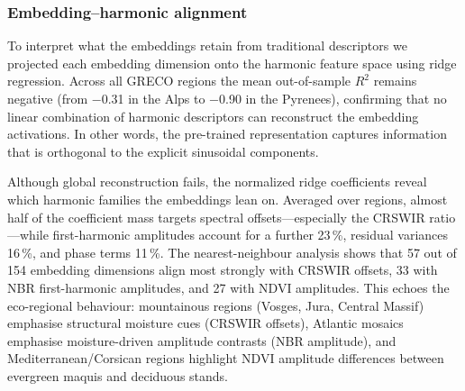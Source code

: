 \documentclass[utf8]{FrontiersinHarvard}
\begin{document}
\subsubsection{Embedding–harmonic alignment}

To interpret what the embeddings retain from traditional descriptors we projected each embedding dimension onto the harmonic feature space using ridge regression. Across all GRECO regions the mean out-of-sample \(R^2\) remains negative (from −0.31 in the Alps to −0.90 in the Pyrenees), confirming that no linear combination of harmonic descriptors can reconstruct the embedding activations. In other words, the pre-trained representation captures information that is orthogonal to the explicit sinusoidal components.

Although global reconstruction fails, the normalized ridge coefficients reveal which harmonic families the embeddings lean on. Averaged over regions, almost half of the coefficient mass targets spectral offsets—especially the CRSWIR ratio—while first-harmonic amplitudes account for a further 23\,\%, residual variances 16\,\%, and phase terms 11\,\%. The nearest-neighbour analysis shows that 57 out of 154 embedding dimensions align most strongly with CRSWIR offsets, 33 with NBR first-harmonic amplitudes, and 27 with NDVI amplitudes. This echoes the eco-regional behaviour: mountainous regions (Vosges, Jura, Central Massif) emphasise structural moisture cues (CRSWIR offsets), Atlantic mosaics emphasise moisture-driven amplitude contrasts (NBR amplitude), and Mediterranean/Corsican regions highlight NDVI amplitude differences between evergreen maquis and deciduous stands.
\end{document}

